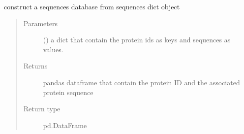 \documentclass[letterpaper,10pt,english]{sphinxmanual}
\begin{document}

\begin{fulllineitems}
\label{\detokenize{IPTK.Utils:IPTK.Utils.UtilityFunction.build_sequence_table}}
construct a sequences database from sequences dict object
\begin{quote}\begin{description}
\item[{Parameters}] \leavevmode
{} (\sphinxstyleliteralemphasis{\sphinxupquote{{[}}}\sphinxstyleliteralemphasis{\sphinxupquote{,}}\sphinxstyleliteralemphasis{\sphinxupquote{{]}}}) \textendash{} a dict that contain the protein ids as keys and sequences as values.

\item[{Returns}] \leavevmode
pandas dataframe that contain the protein ID and the associated protein sequence

\item[{Return type}] \leavevmode
pd.DataFrame

\end{description}\end{quote}

\end{fulllineitems}

\end{document}
